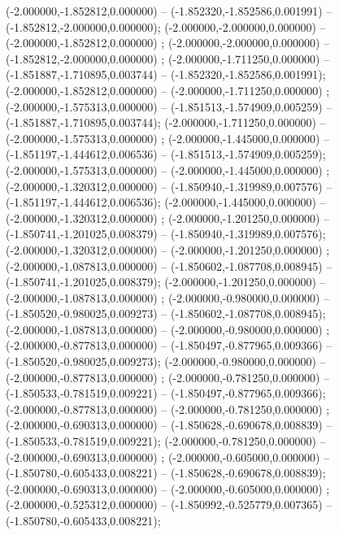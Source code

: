  (-2.000000,-1.852812,0.000000) -- (-1.852320,-1.852586,0.001991) -- (-1.852812,-2.000000,0.000000);
 (-2.000000,-2.000000,0.000000) -- (-2.000000,-1.852812,0.000000) ;
 (-2.000000,-2.000000,0.000000) -- (-1.852812,-2.000000,0.000000) ;
 (-2.000000,-1.711250,0.000000) -- (-1.851887,-1.710895,0.003744) -- (-1.852320,-1.852586,0.001991);
 (-2.000000,-1.852812,0.000000) -- (-2.000000,-1.711250,0.000000) ;
 (-2.000000,-1.575313,0.000000) -- (-1.851513,-1.574909,0.005259) -- (-1.851887,-1.710895,0.003744);
 (-2.000000,-1.711250,0.000000) -- (-2.000000,-1.575313,0.000000) ;
 (-2.000000,-1.445000,0.000000) -- (-1.851197,-1.444612,0.006536) -- (-1.851513,-1.574909,0.005259);
 (-2.000000,-1.575313,0.000000) -- (-2.000000,-1.445000,0.000000) ;
 (-2.000000,-1.320312,0.000000) -- (-1.850940,-1.319989,0.007576) -- (-1.851197,-1.444612,0.006536);
 (-2.000000,-1.445000,0.000000) -- (-2.000000,-1.320312,0.000000) ;
 (-2.000000,-1.201250,0.000000) -- (-1.850741,-1.201025,0.008379) -- (-1.850940,-1.319989,0.007576);
 (-2.000000,-1.320312,0.000000) -- (-2.000000,-1.201250,0.000000) ;
 (-2.000000,-1.087813,0.000000) -- (-1.850602,-1.087708,0.008945) -- (-1.850741,-1.201025,0.008379);
 (-2.000000,-1.201250,0.000000) -- (-2.000000,-1.087813,0.000000) ;
 (-2.000000,-0.980000,0.000000) -- (-1.850520,-0.980025,0.009273) -- (-1.850602,-1.087708,0.008945);
 (-2.000000,-1.087813,0.000000) -- (-2.000000,-0.980000,0.000000) ;
 (-2.000000,-0.877813,0.000000) -- (-1.850497,-0.877965,0.009366) -- (-1.850520,-0.980025,0.009273);
 (-2.000000,-0.980000,0.000000) -- (-2.000000,-0.877813,0.000000) ;
 (-2.000000,-0.781250,0.000000) -- (-1.850533,-0.781519,0.009221) -- (-1.850497,-0.877965,0.009366);
 (-2.000000,-0.877813,0.000000) -- (-2.000000,-0.781250,0.000000) ;
 (-2.000000,-0.690313,0.000000) -- (-1.850628,-0.690678,0.008839) -- (-1.850533,-0.781519,0.009221);
 (-2.000000,-0.781250,0.000000) -- (-2.000000,-0.690313,0.000000) ;
 (-2.000000,-0.605000,0.000000) -- (-1.850780,-0.605433,0.008221) -- (-1.850628,-0.690678,0.008839);
 (-2.000000,-0.690313,0.000000) -- (-2.000000,-0.605000,0.000000) ;
 (-2.000000,-0.525312,0.000000) -- (-1.850992,-0.525779,0.007365) -- (-1.850780,-0.605433,0.008221);
